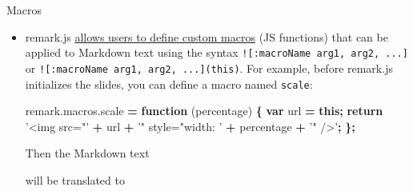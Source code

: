 \documentclass[ignorenonframetext,]{beamer}
\newenvironment{Shaded}{\begin{snugshade}}{\end{snugshade}}
\newcommand{\AlertTok}[1]{\textcolor[rgb]{0.94,0.16,0.16}{#1}}
\newcommand{\AttributeTok}[1]{\textcolor[rgb]{0.77,0.63,0.00}{#1}}
\newcommand{\ControlFlowTok}[1]{\textcolor[rgb]{0.13,0.29,0.53}{\textbf{#1}}}
\newcommand{\KeywordTok}[1]{\textcolor[rgb]{0.13,0.29,0.53}{\textbf{#1}}}
\newcommand{\NormalTok}[1]{#1}
\newcommand{\OperatorTok}[1]{\textcolor[rgb]{0.81,0.36,0.00}{\textbf{#1}}}
\newcommand{\OtherTok}[1]{\textcolor[rgb]{0.56,0.35,0.01}{#1}}
\newcommand{\StringTok}[1]{\textcolor[rgb]{0.31,0.60,0.02}{#1}}
\newcommand{\VariableTok}[1]{\textcolor[rgb]{0.00,0.00,0.00}{#1}}
\begin{document}
\begin{frame}[fragile]{Macros}
\protect\hypertarget{macros}{}

\begin{itemize}
\item
  remark.js \href{https://github.com/yihui/xaringan/issues/80}{allows
  users to define custom macros} (JS functions) that can be applied to
  Markdown text using the syntax
  \texttt{!{[}:macroName\ arg1,\ arg2,\ ...{]}} or
  \texttt{!{[}:macroName\ arg1,\ arg2,\ ...{]}(this)}. For example,
  before remark.js initializes the slides, you can define a macro named
  \texttt{scale}:

\begin{Shaded}
\begin{Highlighting}[]
\VariableTok{remark}\NormalTok{.}\VariableTok{macros}\NormalTok{.}\AttributeTok{scale} \OperatorTok{=} \KeywordTok{function}\NormalTok{ (percentage) }\OperatorTok{\{}
  \KeywordTok{var}\NormalTok{ url }\OperatorTok{=} \KeywordTok{this}\OperatorTok{;}
  \ControlFlowTok{return} \StringTok{'<img src="'} \OperatorTok{+}\NormalTok{ url }\OperatorTok{+} \StringTok{'" style="width: '} \OperatorTok{+}\NormalTok{ percentage }\OperatorTok{+} \StringTok{'" />'}\OperatorTok{;}
\OperatorTok{\};}
\end{Highlighting}
\end{Shaded}

  Then the Markdown text

\begin{Shaded}
\end{Shaded}

  will be translated to

\begin{Shaded}
\end{Shaded}
\end{itemize}

\end{frame}
\end{document}
